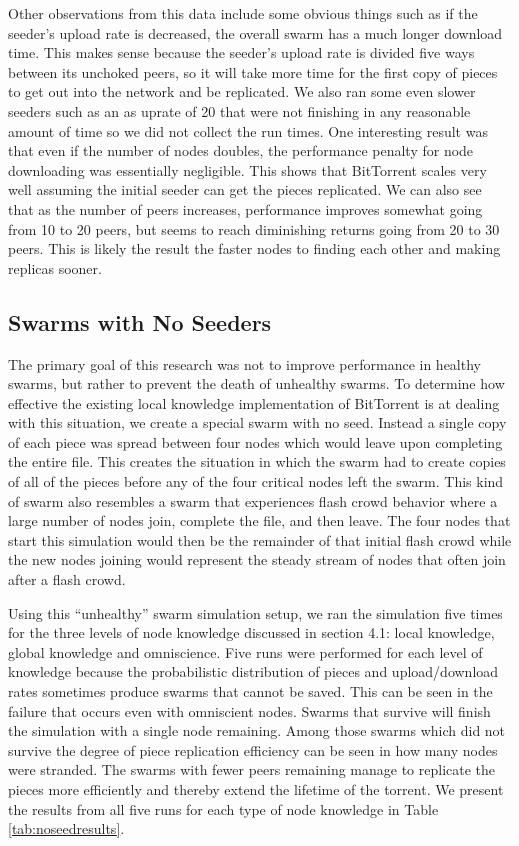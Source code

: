 Other observations from this data include some obvious things such as
if the seeder's upload rate is decreased, the overall swarm has a much
longer download time. This makes sense because the seeder's upload rate
is divided five ways between its unchoked peers, so it will take more
time for the first copy of pieces to get out into the network and be
replicated. We also ran some even slower seeders such as an as uprate
of 20 that were not finishing in any reasonable amount of time so we
did not collect the run times. One interesting result was that even if
the number of nodes doubles, the performance penalty for node downloading
was essentially negligible. This shows that BitTorrent scales very well
assuming the initial seeder can get the pieces replicated.  We can also
see that as the number of peers increases, performance improves somewhat
going from 10 to 20 peers, but seems to reach diminishing returns going
from 20 to 30 peers. This is likely the result the faster nodes to
finding each other and making replicas sooner.



\subsection{Swarms with No Seeders}

The primary goal of this research was not to improve
performance in healthy swarms, but rather to prevent the death of unhealthy
swarms. To determine how effective the existing local knowledge
implementation of BitTorrent is at dealing with this situation, we
create a special swarm with no seed. Instead a single copy of
each piece was spread between four nodes which would leave 
upon completing the entire file. This creates the situation in which the
swarm had to create copies of all of the pieces before any of
the four critical nodes left the swarm. This kind of swarm also
resembles a swarm that experiences flash crowd behavior where a
large number of nodes join, complete the file, and then leave. The
four nodes that start this simulation would then be the remainder of
that initial flash crowd while the new nodes joining would represent
the steady stream of nodes that often join after a flash crowd. 

Using this ``unhealthy'' swarm simulation setup, we ran the
simulation five times for the three levels of node knowledge discussed
in section 4.1: local knowledge, global knowledge and
omniscience. Five runs were performed for each level of knowledge
because the probabilistic distribution of pieces and upload/download
rates sometimes produce swarms that 
cannot be saved. This can be seen in the failure that occurs even
with omniscient nodes. Swarms that survive will finish the simulation
with a single node remaining. Among those swarms which did not survive
the degree of piece replication efficiency can be seen in how many
nodes were stranded. The swarms with fewer peers remaining manage to
replicate the pieces more efficiently and thereby extend the
lifetime of the torrent. We present the results from all five runs for each type
of node knowledge in Table \ref{tab:noseedresults}.

